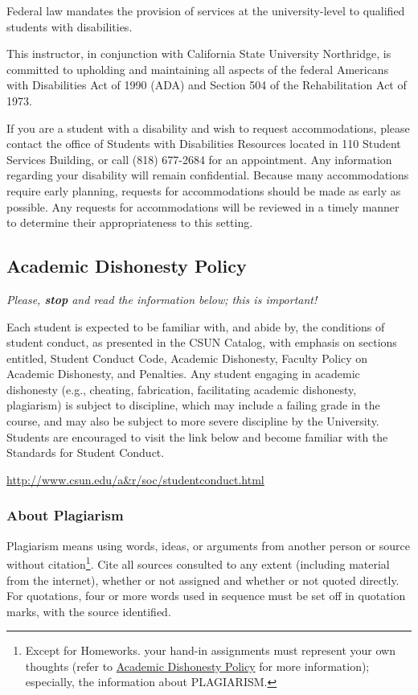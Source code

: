\documentclass[11pt,]{article}
\begin{document}
Federal law mandates the provision of services at the university-level
to qualified students with disabilities.

This instructor, in conjunction with California State University
Northridge, is committed to upholding and maintaining all aspects of the
federal Americans with Disabilities Act of 1990 (ADA) and Section 504 of
the Rehabilitation Act of 1973.

If you are a student with a disability and wish to request
accommodations, please contact the office of Students with Disabilities
Resources located in 110 Student Services Building, or call (818)
677-2684 for an appointment. Any information regarding your disability
will remain confidential. Because many accommodations require early
planning, requests for accommodations should be made as early as
possible. Any requests for accommodations will be reviewed in a timely
manner to determine their appropriateness to this setting.

\hypertarget{dishonesty}{%
\subsection{Academic Dishonesty Policy}\label{dishonesty}}

\emph{Please, \textbf{stop} and read the information below; this is
important!}

Each student is expected to be familiar with, and abide by, the
conditions of student conduct, as presented in the CSUN Catalog, with
emphasis on sections entitled, Student Conduct Code, Academic
Dishonesty, Faculty Policy on Academic Dishonesty, and Penalties. Any
student engaging in academic dishonesty (e.g., cheating, fabrication,
facilitating academic dishonesty, plagiarism) is subject to discipline,
which may include a failing grade in the course, and may also be subject
to more severe discipline by the University. Students are encouraged to
visit the link below and become familiar with the Standards for Student
Conduct.

\url{http://www.csun.edu/a\&r/soc/studentconduct.html}

\hypertarget{about-plagiarism}{%
\subsubsection{About Plagiarism}\label{about-plagiarism}}

Plagiarism means using words, ideas, or arguments from another person or
source without citation\footnote{Except for Homeworks. your hand-in
  assignments must represent your own thoughts (refer to
  \protect\hyperlink{dishonesty}{Academic Dishonesty Policy} for more
  information); especially, the information about PLAGIARISM.}. Cite all
sources consulted to any extent (including material from the internet),
whether or not assigned and whether or not quoted directly. For
quotations, four or more words used in sequence must be set off in
quotation marks, with the source identified.
\end{document}
